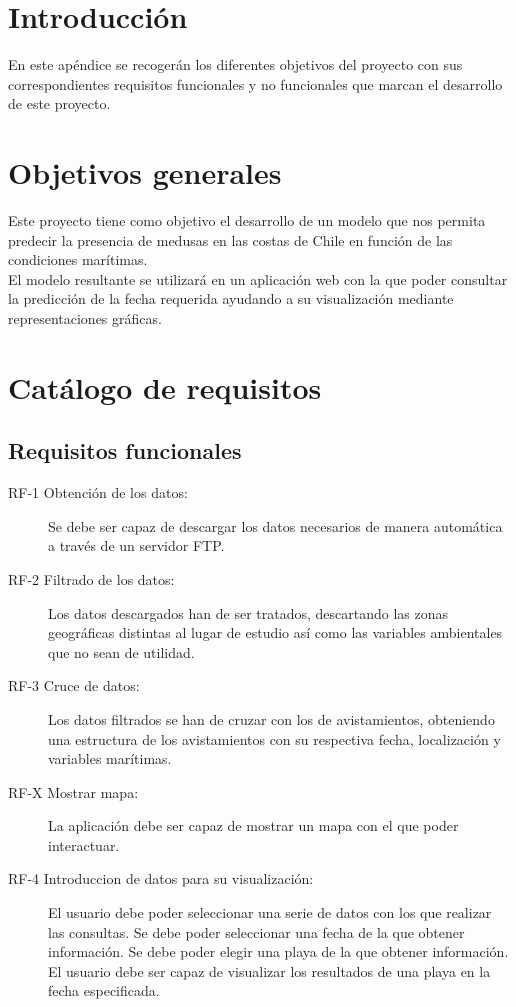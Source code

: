 
\section{Introducción}
En este apéndice se recogerán los diferentes objetivos del proyecto con sus correspondientes requisitos funcionales y no funcionales que marcan el desarrollo de este proyecto.

\section{Objetivos generales}

Este proyecto tiene como objetivo el desarrollo de un modelo que nos permita predecir la presencia de medusas en las costas de Chile en función de las condiciones marítimas.\\
El modelo resultante se utilizará en un aplicación web con la que poder consultar la predicción de la fecha requerida ayudando a su visualización mediante representaciones gráficas.

\section{Catálogo de requisitos}

	\subsection{Requisitos funcionales}

\begin{description}
	\item[RF-1 Obtención de los datos:] Se debe ser capaz de descargar los datos necesarios de manera automática a través de un servidor FTP.
	\item[RF-2 Filtrado de los datos:] Los datos descargados han de ser tratados, descartando las zonas geográficas distintas al lugar de estudio así como las variables ambientales que no sean de utilidad.
	\item[RF-3 Cruce de datos:] Los datos filtrados se han de cruzar con los de avistamientos, obteniendo una estructura de los avistamientos con su respectiva fecha, localización y variables marítimas.	
	\item[RF-X Mostrar mapa:] La aplicación debe ser capaz de mostrar un mapa con el que poder interactuar.
	\item[RF-4 Introduccion de datos para su visualización:] El usuario debe poder seleccionar una serie de datos con los que realizar las consultas.
	 Se debe poder seleccionar una fecha de la que obtener información.
	 Se debe poder elegir una playa de la que obtener información.
	 El usuario debe ser capaz de visualizar los resultados de una playa en la fecha especificada.	
\end{description}

